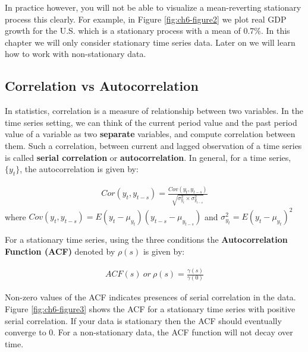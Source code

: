 \documentclass[]{book}
\theoremstyle{definition}
\theoremstyle{definition}
\theoremstyle{definition}
\theoremstyle{remark}
\begin{document}
In practice however, you will not be able to visualize a mean-reverting stationary process this clearly. For example, in Figure \ref{fig:ch6-figure2} we plot real GDP growth for the U.S. which is a stationary process with a mean of 0.7\%. In this chapter we will only consider stationary time series data. Later on we will learn how to work with non-stationary data.

\hypertarget{correlation-vs-autocorrelation}{%
\subsection{Correlation vs Autocorrelation}\label{correlation-vs-autocorrelation}}

In statistics, correlation is a measure of relationship between two variables. In the time series setting, we can think of the current period value and the past period value of a variable as two \textbf{separate} variables, and compute correlation between them. Such a correlation, between current and lagged observation of a time series is called \textbf{serial correlation} or \textbf{autocorrelation}. In general, for a time series, \(\{y_t\}\), the autocorrelation is given by:

\begin{align}
    Cor(y_t,y_{t-s})=\frac{ Cov(y_t,y_{t-s})}{\sqrt{\sigma^2_{y_t} \times \sigma^2_{y_{t-s}}}}
        \end{align}
where \(Cov(y_t,y_{t-s})= E(y_t-\mu_{y_t})(y_{t-s}-\mu_{y_{t-s}})\) and \(\sigma^2_{y_t}=E(y_t-\mu_{y_t})^2\)

For a stationary time series, using the three conditions the \textbf{Autocorrelation Function (ACF)} denoted by \(\rho(s)\) is given by:

\begin{align}
    ACF(s) \ or \ \rho(s)=\frac{\gamma(s)}{\gamma(0)}
    \end{align}

Non-zero values of the ACF indicates presences of serial correlation in the data. Figure \ref{fig:ch6-figure3} shows the ACF for a stationary time series with positive serial correlation. If your data is stationary then the ACF should eventually converge to 0. For a non-stationary data, the ACF function will not decay over time.
\end{document}
